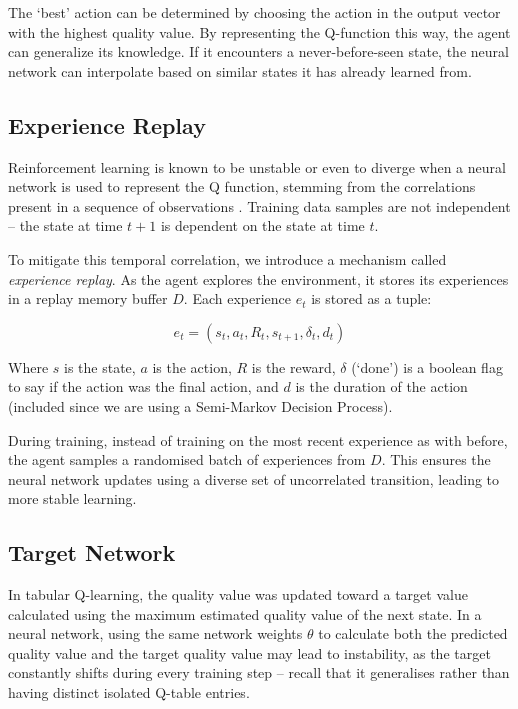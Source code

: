 \documentclass[a4paper]{report}
\begin{document}
The `best' action can be determined by choosing the action in the output vector with the highest quality value. By representing the Q-function this way, the agent can generalize its knowledge. If it encounters a never-before-seen state, the neural network can interpolate based on similar states it has already learned from.

\subsection{Experience Replay}

Reinforcement learning is known to be unstable or even to diverge when a neural network is used to represent the Q function, stemming from the correlations present in a sequence of observations \cite{SLi2023}. Training data samples are not independent -- the state at time $t+1$ is dependent on the state at time $t$.

To mitigate this temporal correlation, we introduce a mechanism called \emph{experience replay}. As the agent explores the environment, it stores its experiences in a replay memory buffer $D$. Each experience $e_t$ is stored as a tuple:

$$e_t=(s_t,a_t,R_t,s_{t+1},\delta_t,d_t)$$

Where $s$ is the state, $a$ is the action, $R$ is the reward, $\delta$ (`done') is a boolean flag to say if the action was the final action, and $d$ is the duration of the action (included since we are using a Semi-Markov Decision Process).

During training, instead of training on the most recent experience as with before, the agent samples a randomised batch of experiences from $D$. This ensures the neural network updates using a diverse set of uncorrelated transition, leading to more stable learning.

\subsection{Target Network}

In tabular Q-learning, the quality value was updated toward a target value calculated using the maximum estimated quality value of the next state. In a neural network, using the same network weights $\theta$ to calculate both the predicted quality value and the target quality value may lead to instability, as the target constantly shifts during every training step -- recall that it generalises rather than having distinct isolated Q-table entries.
\end{document}

